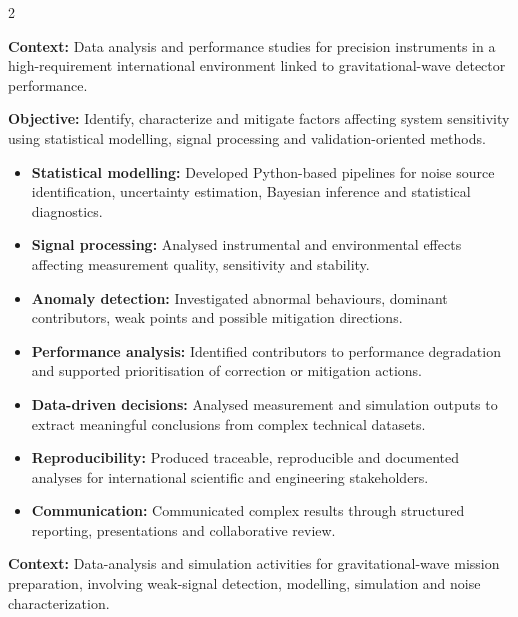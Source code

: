 \documentclass[8pt,a4paper,ragged2e,withhyper]{altacv}
\begin{document}
\begin{paracol}{2}
\divider


\textbf{Context:} Data analysis and performance studies for precision instruments in a high-requirement international environment linked to gravitational-wave detector performance.

\textbf{Objective:} Identify, characterize and mitigate factors affecting system sensitivity using statistical modelling, signal processing and validation-oriented methods.

\begin{itemize}
  \item \textbf{Statistical modelling:} Developed Python-based pipelines for noise source identification, uncertainty estimation, Bayesian inference and statistical diagnostics.
  \item \textbf{Signal processing:} Analysed instrumental and environmental effects affecting measurement quality, sensitivity and stability.
  \item \textbf{Anomaly detection:} Investigated abnormal behaviours, dominant contributors, weak points and possible mitigation directions.
  \item \textbf{Performance analysis:} Identified contributors to performance degradation and supported prioritisation of correction or mitigation actions.
  \item \textbf{Data-driven decisions:} Analysed measurement and simulation outputs to extract meaningful conclusions from complex technical datasets.
  \item \textbf{Reproducibility:} Produced traceable, reproducible and documented analyses for international scientific and engineering stakeholders.
  \item \textbf{Communication:} Communicated complex results through structured reporting, presentations and collaborative review.
\end{itemize}

\divider


\textbf{Context:} Data-analysis and simulation activities for gravitational-wave mission preparation, involving weak-signal detection, modelling, simulation and noise characterization.


\end{paracol}
\end{document}
